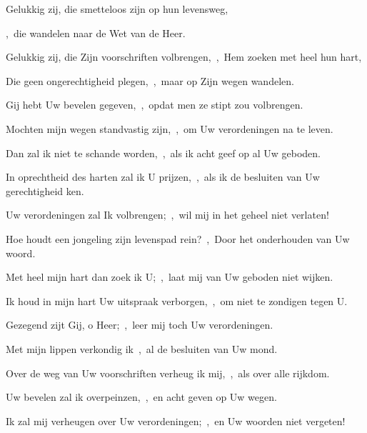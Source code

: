 \documentclass[12pt,twoside,a5paper]{article}
\begin{document}
\begin{halfparskip}
   

  Gelukkig zij, die smetteloos zijn op hun levensweg,


  \sep\ die wandelen naar de Wet van de Heer.

  Gelukkig zij, die Zijn voorschriften volbrengen,~\sep\ Hem zoeken met heel hun hart,

  Die geen ongerechtigheid plegen,~\sep\ maar op Zijn wegen wandelen.

  Gij hebt Uw bevelen gegeven,~\sep\ opdat men ze stipt zou volbrengen.

  Mochten mijn wegen standvastig zijn,~\sep\ om Uw verordeningen na te leven.

  Dan zal ik niet te schande worden,~\sep\ als ik acht geef op al Uw geboden.

  In oprechtheid des harten zal ik U prijzen,~\sep\ als ik de besluiten van Uw gerechtigheid ken.

  Uw verordeningen zal Ik volbrengen;~\sep\ wil mij in het geheel niet verlaten!

  Hoe houdt een jongeling zijn levenspad rein?~\sep\ Door het onderhouden van Uw woord.

  Met heel mijn hart dan zoek ik U;~\sep\ laat mij van Uw geboden niet wijken.

  Ik houd in mijn hart Uw uitspraak verborgen,~\sep\ om niet te zondigen tegen U.

  Gezegend zijt Gij, o Heer;~\sep\ leer mij toch Uw verordeningen.

  Met mijn lippen verkondig ik~\sep\ al de besluiten van Uw mond.

  Over de weg van Uw voorschriften verheug ik mij,~\sep\ als over alle rijkdom.

  Uw bevelen zal ik overpeinzen,~\sep\ en acht geven op Uw wegen.

  Ik zal mij verheugen over Uw verordeningen;~\sep\ en Uw woorden niet vergeten!
\end{halfparskip}
\end{document}
